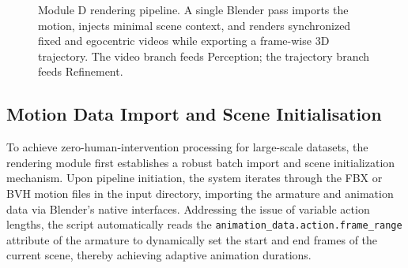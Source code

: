\documentclass[11pt,oneside]{report}
\begin{document}
\begin{figure}[htbp]
\centering
{}
\caption[Module D rendering pipeline]{Module D rendering pipeline. A single Blender pass imports the motion,
injects minimal scene context, and renders synchronized fixed and egocentric
videos while exporting a frame-wise 3D trajectory. The video branch feeds
Perception; the trajectory branch feeds Refinement.}
\label{fig:module-d}
\end{figure}

\subsection{Motion Data Import and Scene Initialisation}
To achieve zero-human-intervention processing for large-scale datasets, the rendering module first establishes a robust batch import and scene initialization mechanism. Upon pipeline initiation, the system iterates through the FBX or BVH motion files in the input directory, importing the armature and animation data via Blender's native interfaces. Addressing the issue of variable action lengths, the script automatically reads the \texttt{animation\_data.action.frame\_range} attribute of the armature to dynamically set the start and end frames of the current scene, thereby achieving adaptive animation durations.
\end{document}
